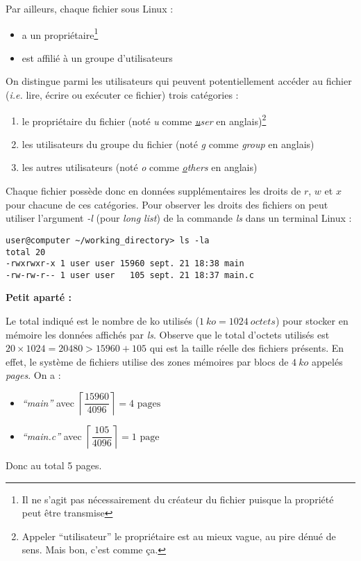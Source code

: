 \documentclass[../../../main.tex]{subfiles}
\begin{document}
Par ailleurs, chaque fichier sous Linux :
\begin{itemize}
	\item a un propriétaire\footnote{Il ne s'agit pas nécessairement du créateur du fichier puisque la propriété peut être transmise}
	\item est affilié à un groupe d'utilisateurs
\end{itemize}
On distingue parmi les utilisateurs qui peuvent potentiellement accéder au fichier (\textit{i.e.} lire, écrire ou exécuter ce fichier) trois catégories :
\begin{enumerate}
	\item le propriétaire du fichier (noté \textit{u} comme \textit{\underline{u}ser} en anglais)\footnote{Appeler ``utilisateur'' le propriétaire est au mieux vague, au pire dénué de sens. Mais bon, c'est comme ça.}
	\item les utilisateurs du groupe du fichier (noté \textit{g} comme \textit{\underline{g}roup} en anglais)
	\item les autres utilisateurs (noté \textit{o} comme \textit{\underline{o}thers} en anglais)
\end{enumerate}
Chaque fichier possède donc en données supplémentaires les droits de $r$, $w$ et $x$ pour chacune de ces catégories. \newline
Pour observer les droits des fichiers on peut utiliser l'argument \textit{-l} (pour \textit{long list}) de la commande \textit{ls} dans un terminal Linux :
\begin{verbatim}
user@computer ~/working_directory> ls -la
total 20
-rwxrwxr-x 1 user user 15960 sept. 21 18:38 main
-rw-rw-r-- 1 user user	 105 sept. 21 18:37 main.c
\end{verbatim}
\textbf{Petit aparté :}
 
Le total indiqué est le nombre de ko utilisés ($1\ ko = 1024\ octets$) pour stocker en mémoire les données affichés par \textit{ls}. Observe que le total d'octets utilisés est $20\times{1024} = 20480>15960 + 105$ qui est la taille réelle des fichiers présents. En effet, le système de fichiers utilise des zones mémoires par blocs de $4\ ko$ appelés \textit{pages}. On a :
\begin{itemize}
	\item \textit{``main''} avec $\left\lceil\dfrac{15960}{4096}\right\rceil = 4 \text{ pages}$
	\item \textit{``main.c''} avec $\left\lceil\dfrac{105}{4096}\right\rceil = 1\text{\ page}$
\end{itemize}
Donc au total 5 pages.
 
\end{document}
